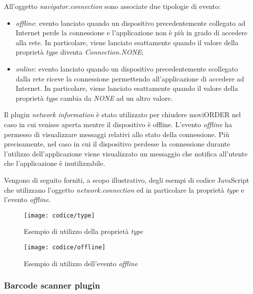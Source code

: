 All'oggetto \textit{navigator.connection} sono associate due tipologie di evento:
\begin{itemize}
	\item \textit{offline}: evento lanciato quando un dispositivo precedentemente collegato ad Internet perde la connessione e l'applicazione non è più in grado di accedere alla rete. In particolare, viene lanciato esattamente quando il valore della proprietà \textit{type} diventa \textit{Connection.NONE};
	\item \textit{online}: evento lanciato quando un dispositivo precedentemente scollegato dalla rete riceve la connessione permettendo all'applicazione di accedere ad Internet. In particolare, viene lanciato esattamente quando il valore della proprietà \textit{type} cambia da \textit{NONE} ad un altro valore.
\end{itemize}
Il plugin \textit{network information} è stato utilizzato per chiudere moviORDER nel caso in cui venisse aperta mentre il dispositivo è offline. L'evento \textit{offline} ha permesso di visualizzare messaggi relativi allo stato della connessione. Più precisamente, nel caso in cui il dispositivo perdesse la connessione durante l'utilizzo dell'applicazione viene visualizzato un messaggio che notifica all'utente che l'applicazione è inutilizzabile.

Vengono di seguito forniti, a scopo illustrativo, degli esempi di codice JavaScript che utilizzano l'oggetto \textit{network.connection} ed in particolare la proprietà \textit{type} e l'evento \textit{offline}.

\begin{figure}[!h] 
    \centering 
    \texttt{[image: codice/type]} 
    \caption{Esempio di utilizzo della proprietà \textit{type}}
\end{figure}

\begin{figure}[!h] 
    \centering 
    \texttt{[image: codice/offline]} 
    \caption{Esempio di utilizzo dell'evento \textit{offline}}
\end{figure}

\subsubsection{Barcode scanner plugin}

